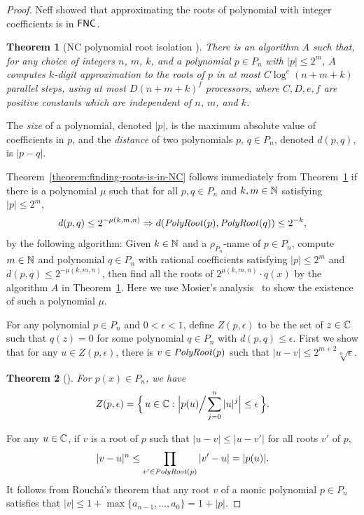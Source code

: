 \documentclass{article}
\newtheorem{theorem}{Theorem}[section]
\theoremstyle{definition}
\theoremstyle{remark}
\begin{document}
\begin{proof}
Neff showed that approximating the roots of polynomial with integer coefficients
is in $\mathsf{FNC}$.
\begin{theorem}
[NC polynomial root isolation \cite{neff1994specified}]\label{theorem:neff1994}
There is an algorithm $A$ such that,
for any choice of integers $n$, $m$, $k$, and a polynomial $p \in P_n$
with $|p| \le 2^m$,
$A$ computes $k$-digit approximation to the roots of $p$ 
in at most $C \log^e(n + m + k)$ parallel steps, 
using at most $D(n + m + k)^f$ processors, where $C, D, e, f$ are positive
constants which are independent of $n$, $m$, and $k$.
\end{theorem}
The \emph{size} of a polynomial, denoted $|p|$, is the maximum absolute value
 of coefficients in $p$, and the \emph{distance} of
two polynomials $p$, $q \in P_n$, denoted $d(p, q)$, is $|p-q|$.

Theorem~\ref{theorem:finding-roots-is-in-NC} follows immediately from
Theorem~\ref{theorem:neff1994}
if there is a polynomial $\mu$ such that for all $p, q \in P_n$ and
$k, m \in \mathbb N$ satisfying $|p| \le 2^m$,
\begin{equation}
  d(p, q) \le 2^{-\mu(k, m, n)} \Rightarrow d(\mathit{PolyRoot}(p), \mathit{PolyRoot}(q)) \le 2^{-k},
\end{equation}
by the following algorithm:
Given $k \in \mathbb N$ and a $\rho_{P_n}$-name of $p \in P_n$, 
compute $m \in \mathbb N$ and polynomial $q \in {P_n}$ with rational coefficients
satisfying $|p| \le 2^m$ and $d(p, q) \le 2^{-\mu(k, m, n)}$,
then find all the roots of $2^{\mu(k, m, n)} \cdot q(x)$ by the algorithm $A$ 
in Theorem~\ref{theorem:neff1994}.
Here we use Mosier's analysis~\cite{mosier1986root} 
to show the existence of such a polynomial $\mu$.

For any polynomial $p \in P_n$ and $0 < \epsilon < 1$, 
define $Z(p, \epsilon)$ to be the set of $z \in \mathbb C$
such that $q(z) = 0$ 
for some polynomial $q \in P_n$ with $d(p, q) \le \epsilon$. 
First we show that for any $u \in Z(p, \epsilon)$, there is $v \in \mathit{PolyRoot}(p)$ such that $|u - v| \le 2^{m+2}\sqrt[n]{\epsilon}$.
\begin{theorem} 
[{\cite[Theorem 1]{mosier1986root}}]
\label{theorem: root neighborhoods 1}
 For $p(x) \in P_n$, we have
 \begin{equation}
  Z(p, \epsilon) = \Bigl\{\, u \in \mathbb C : \Bigl| p(u) \!\!\Bigm/\! \sum _{j=0} ^n |u|^j \Bigr| \le \epsilon \,\Bigr\}. 
 \end{equation}
\end{theorem}
For any $u \in \mathbb C$, if $v$ is a root of $p$ such that 
$|u - v| \le |u - v'|$ for all roots $v'$ of $p$,
\begin{equation}
 |v - u|^n
 \le \prod_{v' \in \mathit{PolyRoot}(p)} |v' - u|
 = |p(u)|.
\end{equation}
It follows from  Rouch\'a's theorem that
any root $v$ of a monic polynomial $p \in P_n$ satisfies that
$|v| \le 1 + \max\{a_{n-1}, \dots, a_0\} = 1 + |p|$.


\end{proof}
\end{document}
